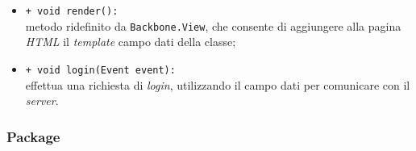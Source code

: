 \begin{flushleft}
\begin{itemize}
\begin{sloppypar}
\begin{itemize}
\item \texttt{+ void render():}\\ metodo ridefinito da \texttt{Backbone.View}, che consente di aggiungere alla pagina \textit{HTML} il \textit{template} campo dati della classe;
\item \texttt{+ void login(Event event):}\\ effettua una richiesta di \textit{login}, utilizzando il campo dati \model{} per comunicare con il \textit{server}.
\end{itemize}
\end{sloppypar}
\end{itemize}
\end{flushleft}

\subsubsection{Package \logicUser{}}

